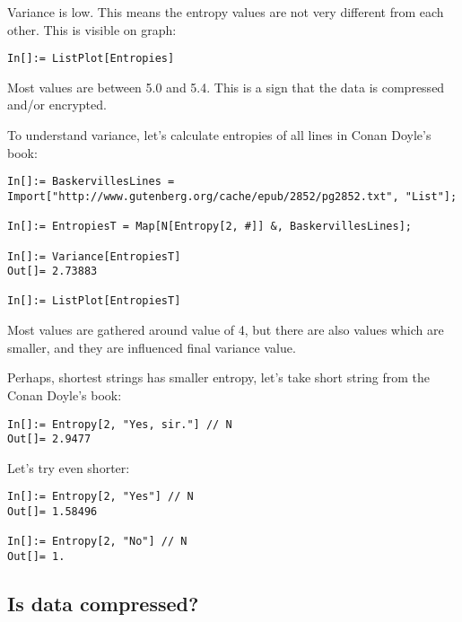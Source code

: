 Variance is low.
This means the entropy values are not very different from each other.
This is visible on graph:

\begin{lstlisting}
In[]:= ListPlot[Entropies]
\end{lstlisting}

\begin{figure}[H]
\centering
{}
\end{figure}

Most values are between 5.0 and 5.4.
This is a sign that the data is compressed and/or encrypted.

To understand variance, let's calculate entropies of all lines in Conan Doyle's  book:

\begin{lstlisting}
In[]:= BaskervillesLines = Import["http://www.gutenberg.org/cache/epub/2852/pg2852.txt", "List"];

In[]:= EntropiesT = Map[N[Entropy[2, #]] &, BaskervillesLines];

In[]:= Variance[EntropiesT]
Out[]= 2.73883

In[]:= ListPlot[EntropiesT]
\end{lstlisting}

\begin{figure}[H]
\centering
{}
\end{figure}

Most values are gathered around value of 4, but there are also values which are smaller,
and they are influenced final variance value.

Perhaps, shortest strings has smaller entropy, let's take short string from the Conan Doyle's book:

\begin{lstlisting}
In[]:= Entropy[2, "Yes, sir."] // N
Out[]= 2.9477
\end{lstlisting}

Let's try even shorter:

\begin{lstlisting}
In[]:= Entropy[2, "Yes"] // N
Out[]= 1.58496

In[]:= Entropy[2, "No"] // N
Out[]= 1.
\end{lstlisting}

\subsection{Is data compressed?}

